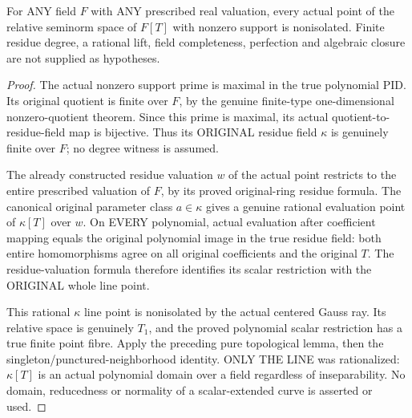 \begin{theorem}
\label{spectrum:actual-rigid-line-nonisolation}
\leanok
{}
For ANY field $F$ with ANY prescribed real valuation, every actual
point of the relative seminorm space of $F[T]$ with nonzero
support is nonisolated. Finite residue degree, a rational lift,
field completeness, perfection and algebraic closure are not
supplied as hypotheses.
\end{theorem}
\begin{proof}
The actual nonzero support prime is maximal in the true polynomial
PID. Its original quotient is finite over $F$, by the genuine
finite-type one-dimensional nonzero-quotient theorem. Since this
prime is maximal, its actual quotient-to-residue-field map is
bijective. Thus its ORIGINAL residue field $\kappa$ is genuinely
finite over $F$; no degree witness is assumed.

The already constructed residue valuation $w$ of the actual point
restricts to the entire prescribed valuation of $F$, by its proved
original-ring residue formula. The canonical original parameter
class $a\in\kappa$ gives a genuine rational evaluation point of
$\kappa[T]$ over $w$. On EVERY polynomial, actual evaluation after
coefficient mapping equals the original polynomial image in the
true residue field: both entire homomorphisms agree on all original
coefficients and the original $T$. The residue-valuation formula
therefore identifies its scalar restriction with the ORIGINAL
whole line point.

This rational $\kappa$ line point is nonisolated by the actual
centered Gauss ray. Its relative space is genuinely $T_1$, and the
proved polynomial scalar restriction has a true finite point
fibre. Apply the preceding pure topological lemma, then the
singleton/punctured-neighborhood identity. ONLY THE LINE was
rationalized: $\kappa[T]$ is an actual polynomial domain over a
field regardless of inseparability. No domain, reducedness or
normality of a scalar-extended curve is asserted or used.
\end{proof}

